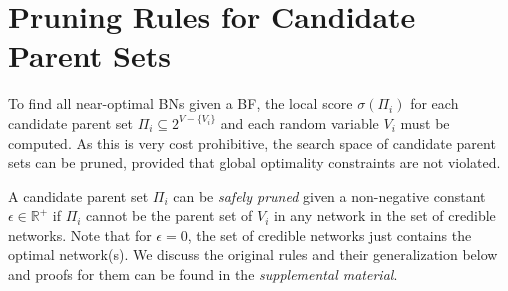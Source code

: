 \documentclass[letterpaper]{article}
\newcommand{\vertex}[1]{V_{#1}}
\newcommand{\vertices}{\mathit{V}}
\newcommand{\parents}{\Pi}
\begin{document}
\section{Pruning Rules for Candidate Parent Sets}\label{sec:pruning}

To find all near-optimal BNs given a BF, the local score $\sigma( \parents_{i} )$
for each candidate parent set
$\parents_{i} \subseteq 2^{\vertices - \{\vertex{i}\}}$
and each random variable $\vertex{i}$ must be computed. As this is very cost prohibitive, the search space of candidate parent sets can be pruned, provided that global optimality constraints are not violated.





A candidate parent set $\Pi_i$ can be \textit{safely pruned} given a non-negative constant $\epsilon \in \mathbb{R}^+$ if $\Pi_i$ cannot be the parent set of $V_i$ in any network in the set of credible networks. Note that for $\epsilon=0$, the set of credible  networks just contains the optimal network(s). We discuss the original rules and their generalization below and proofs for them can be found in the \emph{supplemental material}.
\end{document}
